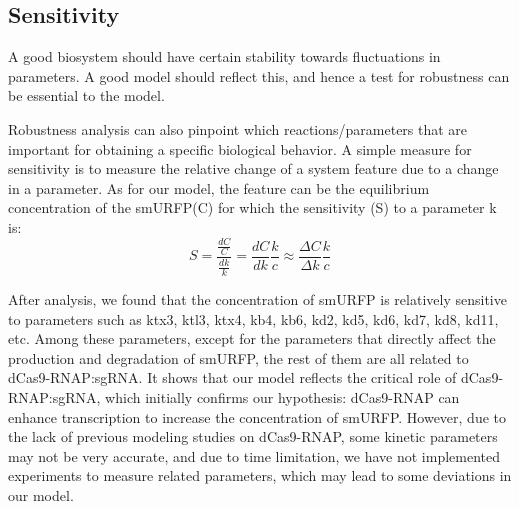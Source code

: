 \subsection{Sensitivity }
A good biosystem should have certain stability towards fluctuations in parameters. A good model should reflect this, and hence a test for robustness can be essential to the model.

Robustness analysis can also pinpoint which reactions/parameters that are important for obtaining a specific biological behavior. A simple measure for sensitivity is to measure the relative change of a system feature due to a change in a parameter. As for our model, the feature can be the equilibrium concentration of the smURFP(C) for which the sensitivity (S) to a parameter k is:
\begin{equation}
	S=\frac{\frac{dC}{C}}{\frac{dk}{k}}=\frac{dC}{dk}\frac{k}{c}\approx \frac{\Delta C}{\Delta k}\frac{k}{c}
\end{equation}

After analysis, we found that the concentration of smURFP is relatively sensitive to parameters such as ktx3, ktl3, ktx4, kb4, kb6, kd2, kd5, kd6, kd7, kd8, kd11, etc. Among these parameters, except for the parameters that directly affect the production and degradation of smURFP, the rest of them are all related to dCas9-RNAP:sgRNA. It shows that our model reflects the critical role of dCas9-RNAP:sgRNA, which initially confirms our hypothesis: dCas9-RNAP can enhance transcription to increase the concentration of smURFP. However, due to the lack of previous modeling studies on dCas9-RNAP, some kinetic parameters may not be very accurate, and due to time limitation, we have not implemented experiments to measure related parameters, which may lead to some deviations in our model.

